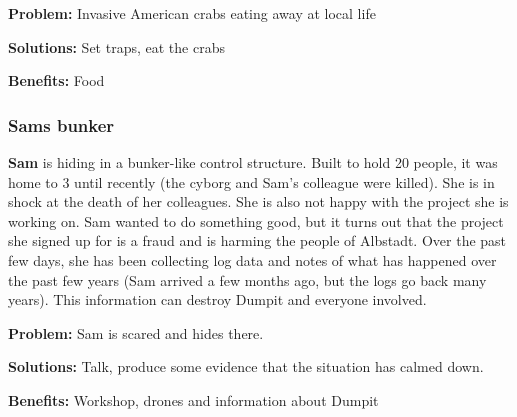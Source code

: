 
\textbf{Problem:} Invasive American crabs eating away at local life

\textbf{Solutions:} Set traps, eat the crabs

\textbf{Benefits:} Food

\subsubsection{Sams bunker}

\textbf{Sam} is hiding in a bunker-like control structure. Built to hold 20 people, it was home to 3 until recently (the cyborg and Sam's colleague were killed). She is in shock at the death of her colleagues. She is also not happy with the project she is working on. Sam wanted to do something good, but it turns out that the project she signed up for is a fraud and is harming the people of Albstadt. Over the past few days, she has been collecting log data and notes of what has happened over the past few years (Sam arrived a few months ago, but the logs go back many years). This information can destroy Dumpit and everyone involved.

\textbf{Problem:} Sam is scared and hides there.

\textbf{Solutions:} Talk, produce some evidence that the situation has calmed down.

\textbf{Benefits:} Workshop, drones and information about Dumpit


